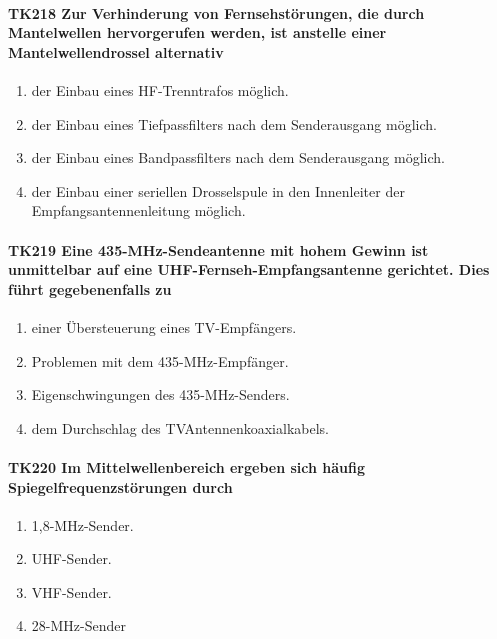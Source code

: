 \documentclass[8pt]{article}
\begin{document}
\paragraph*{TK218 Zur Verhinderung von Fernsehstörungen, die durch Mantelwellen hervorgerufen werden, ist anstelle einer Mantelwellendrossel alternativ}
\begin{enumerate}[nolistsep,label=\Alph*]
\item der Einbau eines HF-Trenntrafos möglich.
\item der Einbau eines Tiefpassfilters nach dem Senderausgang möglich.
\item der Einbau eines Bandpassfilters nach dem Senderausgang möglich.
\item der Einbau einer seriellen Drosselspule in den Innenleiter der Empfangsantennenleitung möglich.
\end{enumerate}

\paragraph*{TK219 Eine 435-MHz-Sendeantenne mit hohem Gewinn ist unmittelbar auf eine UHF-Fernseh-Empfangsantenne gerichtet. Dies führt gegebenenfalls zu}
\begin{enumerate}[nolistsep,label=\Alph*]
\item einer Übersteuerung eines TV-Empfängers.
\item Problemen mit dem 435-MHz-Empfänger.
\item Eigenschwingungen des 435-MHz-Senders.
\item dem Durchschlag des TVAntennenkoaxialkabels.
\end{enumerate}

\paragraph*{TK220 Im Mittelwellenbereich ergeben sich häufig Spiegelfrequenzstörungen durch}
\begin{enumerate}[nolistsep,label=\Alph*]
\item 1,8-MHz-Sender.
\item UHF-Sender.
\item VHF-Sender.
\item 28-MHz-Sender
\end{enumerate}
\end{document}
